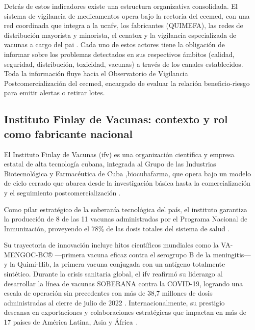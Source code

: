 Detrás de estos indicadores existe una estructura organizativa consolidada. 
El sistema de vigilancia de medicamentos opera bajo la rectoría del \gls{cecmed}, con una red coordinada que integra a la \gls{ucnfv}, los fabricantes (QUIMEFA), las redes de distribución mayorista y minorista, el \gls{cenatox} y la vigilancia especializada de vacunas a cargo del \gls{pai} \cite{paho_vigilancia_medicamentos_cuba}. 
Cada uno de estos actores tiene la obligación de informar sobre los problemas detectados en sus respectivos ámbitos (calidad, seguridad, distribución, toxicidad, vacunas) a través de los canales establecidos.
Toda la información fluye hacia el Observatorio de Vigilancia Postcomercialización del \gls{cecmed}, encargado de evaluar la relación beneficio-riesgo para emitir alertas o retirar lotes.

\subsection{Instituto Finlay de Vacunas: contexto y rol como fabricante nacional}

El Instituto Finlay de Vacunas (\gls{ifv}) es una organización científica y empresa estatal de alta tecnología cubana, integrada al Grupo de las Industrias Biotecnológica y Farmacéutica de Cuba ,\gls{biocubafarma}, que opera bajo un modelo de ciclo cerrado que abarca desde la investigación básica hasta la comercialización y el seguimiento postcomercialización \cite{finlay_instituto_2026}.

Como pilar estratégico de la soberanía tecnológica del país, el instituto garantiza la producción de 8 de las 11 vacunas administradas por el Programa Nacional de Inmunización, proveyendo el 78\% de las dosis totales del sistema de salud \cite{carbonell_cmi_finlay_2016}.

Su trayectoria de innovación incluye hitos científicos mundiales como la VA-MENGOC-BC® —primera vacuna eficaz contra el serogrupo B de la meningitis— y la Quimi-Hib, la primera vacuna conjugada con un antígeno totalmente sintético. 
Durante la crisis sanitaria global, el \gls{ifv} reafirmó su liderazgo al desarrollar la línea de vacunas SOBERANA contra la COVID-19, logrando una escala de operación sin precedentes con más de 38,7 millones de dosis administradas al cierre de julio de 2022 \cite{finlay_instituto_2026}. 
Internacionalmente, su prestigio descansa en exportaciones y colaboraciones estratégicas que impactan en más de 17 países de América Latina, Asia y África \cite{carbonell_cmi_finlay_2016}.



